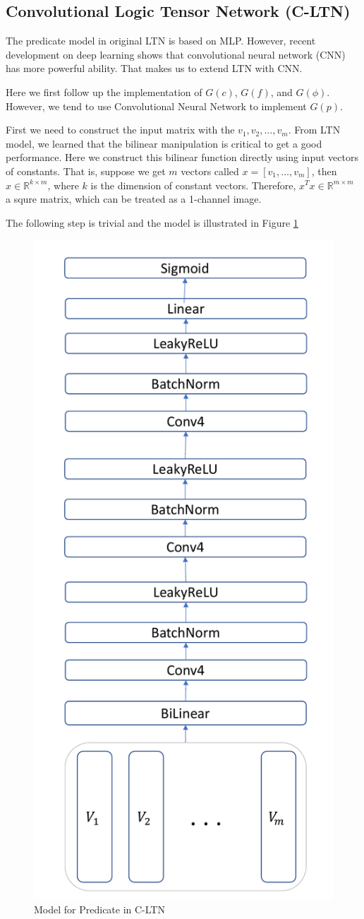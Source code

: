 \subsection{Convolutional Logic Tensor Network (C-LTN)}

The predicate model in original LTN is based on MLP. However, recent development on deep learning shows that convolutional neural network (CNN) has more powerful ability. That makes us to extend LTN with CNN.

Here we first follow up the implementation of $G(c)$, $G(f)$, and $G(\phi)$. However, we tend to use Convolutional Neural Network to implement $G(p)$.

First we need to construct the input matrix with the $v_1,v_2,\dots,v_m$. From LTN model, we learned that the bilinear manipulation is critical to get a good performance. Here we construct this bilinear function directly using input vectors of constants. That is, suppose we get $m$ vectors called $x=[v_1,\dots,v_m]$, then $x\in \mathbb{R}^{k\times m}$, where $k$ is the dimension of constant vectors. Therefore, $x^Tx \in \mathbb{R}^{m\times m}$ a squre matrix, which can be treated as a 1-channel image.

The following step is trivial and the model is illustrated in Figure \ref{fig:CLTN_predicate}

\begin{figure}
    \centering
    \includegraphics[width=.4\textwidth]{img/CLTN_Predicate.pdf}
    \caption{Model for Predicate in C-LTN}
    \label{fig:CLTN_predicate}
\end{figure}

